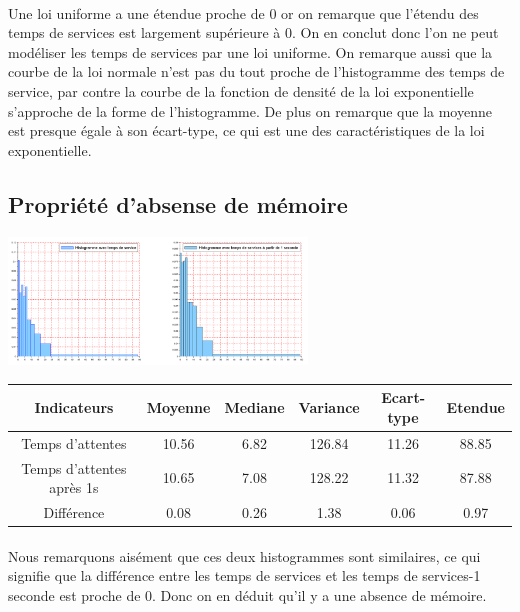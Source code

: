 \documentclass{article}
\begin{document}
\paragraph{}
Une loi uniforme a une étendue proche de 0 or on remarque que l’étendu des temps de services est largement supérieure à 0. On en conclut donc l’on ne peut modéliser les temps de services par une loi uniforme. On remarque aussi que la courbe de la loi normale n’est pas du tout proche de l’histogramme des temps de service, par contre la courbe de la fonction de densité de la loi exponentielle s’approche de la forme de l’histogramme. De plus on remarque que la moyenne est presque égale à son écart-type, ce qui est une des caractéristiques de la loi exponentielle.

\subsection{Propriété d'absense de mémoire}
\begin{center}
\includegraphics[width=300px]{img/S2_mem.png}
\end{center}

\begin{center}
\begin{tabular}{|c|c|c|c|c|c|}
  \hline
  Indicateurs & Moyenne & Mediane & Variance & Ecart-type & Etendue \\
  \hline
  Temps d'attentes & 10.56 & 6.82 & 126.84 & 11.26 & 88.85 \\
  Temps d'attentes après 1s & 10.65 & 7.08 & 128.22 & 11.32 & 87.88 \\
  Différence & 0.08 & 0.26 & 1.38 & 0.06 & 0.97 \\
  \hline
\end{tabular}
\end{center}

\paragraph{}
Nous remarquons aisément que ces deux histogrammes sont similaires, ce qui signifie que la différence entre les temps de services et les temps de services-1 seconde est proche de 0. Donc on en déduit qu’il y a une absence de mémoire.
\end{document}
